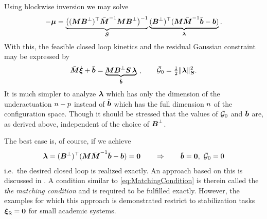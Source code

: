 Using blockwise inversion we may solve
\begin{align}\label{eq:DefMatchingForce}
 -\tuple{\mu} = \underbrace{\big( (\sysInertiaMat \sysInputMatLComp)^\top \sysInertiaMatC^{-1} \sysInertiaMat \sysInputMatLComp \big)^{-1}}_{\mat{S}} \underbrace{(\sysInputMatLComp)^\top (\sysInertiaMat \sysInertiaMatC^{-1} \sysForceC - \sysForce)}_{\tuple{\lambda}}.
\end{align}
With this, the feasible closed loop kinetics and the residual Gaussian constraint may be expressed by
\begin{align}
 \sysInertiaMatC\sysVeld + \sysForceC = \underbrace{\sysInertiaMat \sysInputMatLComp \mat{S} \, \tuple{\lambda}}_{\tilde{\sysForce}} \ ,
\qquad
 \GaussianConstraintC_0 = \tfrac{1}{2} \norm[\mat{S}]{\tuple{\lambda}}^2.
\end{align}
It is much simpler to analyze $\tuple{\lambda}$ which has only the dimension of the underactuation $\dimConfigSpace-\numInputs$ instead of $\tilde{\tuple{b}}$ which has the full dimension $\dimConfigSpace$ of the configuration space.
Though it should be stressed that the values of $\GaussianConstraintC_0$ and $\tilde{\tuple{b}}$ are, as derived above, independent of the choice of $\sysInputMatLComp$.

The best case is, of course, if we achieve 
\begin{align}\label{eq:MatchingCondition}
 \tuple{\lambda} = (\sysInputMatLComp)^\top (\sysInertiaMat \sysInertiaMatC^{-1} \sysForceC - \sysForce) = \tuple{0}
\qquad \Rightarrow \qquad
 \tilde{\tuple{b}} = \tuple{0}, \ \GaussianConstraintC_0 = 0
\end{align}
i.e.\ the desired closed loop is realized exactly.
An approach based on this is discussed in \cite{bloch2000controlled}.
A condition similar to \eqref{eq:MatchingCondition} is therein called the \textit{the matching condition} and is required to be fulfilled exactly.
However, the examples for which this approach is demonstrated restrict to stabilization tasks $\sysVelR = \tuple{0}$ for small academic systems.

